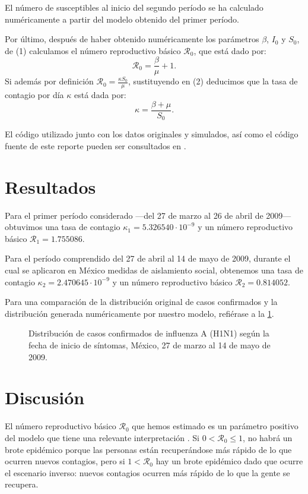 \documentclass[12pt]{article}
\begin{document}
	El número de susceptibles al inicio del segundo período se ha calculado numéricamente a partir del modelo obtenido del primer período.
	\vspace{5mm}
	
	Por último, después de haber obtenido numéricamente los parámetros $ \beta $, $ I_0 $ y $ S_0 $, de (1) calculamos el número reproductivo básico $ \mathcal{R}_0 $, que está dado por: 
	\[ \mathcal{R}_0 = \frac{\beta}{\mu} + 1. \tag{2} \]
	Si además por definición $ \mathcal{R}_0 = \frac{\kappa S_0}{\mu} $, sustituyendo en (2) deducimos que la tasa de contagio por día $ \kappa $ está dada por:
	\[ \kappa = \frac{\beta + \mu}{S_0}. \]
	\vspace{5mm}
	
	El código utilizado junto con los datos originales y simulados, así como el código fuente de este reporte pueden ser consultados en \cite{MendozaOrtiz2019}.
	
	\section{Resultados}
	
	Para el primer período considerado ---del 27 de marzo al 26 de abril de 2009--- obtuvimos una tasa de contagio $ \kappa_1 = 5.326540 \cdot 10^{-9} $ y un número reproductivo básico $ \mathcal{R}_1 = 1.755086 $. 
	
	Para el período comprendido del 27 de abril al 14 de mayo de 2009, durante el cual se aplicaron en México medidas de aislamiento social, obtenemos una tasa de contagio $ \kappa_2 = 2.470645\cdot 10^{-9} $ y un número reproductivo básico $ \mathcal{R}_2 = 0.814052 $.
	
	Para una comparación de la distribución original de casos confirmados y la distribución generada numéricamente por nuestro modelo, refiérase a la \cref{plot:casos}.
	
	\begin{figure}
		\centering
		
		\caption{Distribución de casos confirmados de influenza A (H1N1) según la fecha de inicio de síntomas, México, 27 de marzo al 14 de mayo de 2009.}
		\label{plot:casos}		
	\end{figure}
	
	\section{Discusión}
	
	El número reproductivo básico $ \mathcal{R}_0 $ que hemos estimado es un parámetro positivo del modelo que tiene una relevante interpretación \cite{Driessche2017}. Si $ 0 < \mathcal{R}_0 \leq 1 $, no habrá un brote epidémico porque las personas están recuperándose más rápido de lo que ocurren nuevos contagios, pero si $ 1 < \mathcal{R}_0 $ hay un brote epidémico dado que ocurre el escenario inverso: nuevos contagios ocurren más rápido de lo que la gente se recupera. 
	
\end{document}
